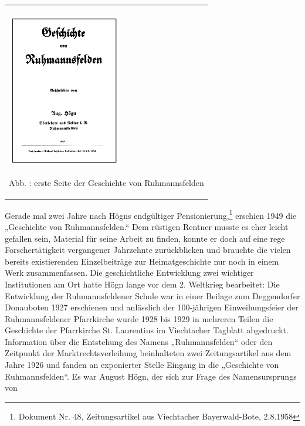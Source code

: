 \documentclass[a4paper]{article}
\newcounter{Abb}
\renewcommand\theAbb{\arabic{Abb}}
\begin{document}
\begin{flushleft}
\tablefirsthead{}
\tablehead{}
\tabletail{}
\tablelasttail{}
\begin{supertabular}{m{5.2310004cm}}

\begin{center}

\includegraphics[width=4.995cm,height=6.833cm]{pictures/zulassungsarbeit-img040.png}

\end{center}
Abb. \stepcounter{Abb}{\theAbb}: erste Seite der Geschichte von
Ruhmannsfelden\\
\end{supertabular}
\end{flushleft}
Gerade mal zwei Jahre nach Högns endgültiger Pensionierung,\footnote{
Dokument Nr. 48, Zeitungsartikel aus Viechtacher Bayerwald-Bote,
2.8.1958} erschien 1949 die „Geschichte von Ruhmannsfelden.“ Dem
rüstigen Rentner musste es eher leicht gefallen sein, Material für
seine Arbeit zu finden, konnte er doch auf eine rege Forschertätigkeit
vergangener Jahrzehnte zurückblicken und brauchte die vielen bereits
existierenden Einzelbeiträge zur Heimatgeschichte nur noch in einem
Werk zusammenfassen. Die geschichtliche Entwicklung zwei wichtiger
Institutionen am Ort hatte Högn lange vor dem 2. Weltkrieg bearbeitet:
Die Entwicklung der Ruhmannsfeldener Schule war in einer Beilage zum
Deggendorfer Donauboten 1927 erschienen und anlässlich der 100-jährigen
Einweihungsfeier der Ruhmannsfeldener Pfarrkirche wurde 1928 bis 1929
in mehreren Teilen die Geschichte der Pfarrkirche St. Laurentius im
Viechtacher Tagblatt abgedruckt. Information über die Entstehung des
Namens „Ruhmannsfelden“ oder den Zeitpunkt der Marktrechtsverleihung
beinhalteten zwei Zeitungsartikel aus dem Jahre 1926 und fanden an
exponierter Stelle Eingang in die „Geschichte von Ruhmannsfelden“. Es
war August Högn, der sich zur Frage des Namensursprungs von
\end{document}
